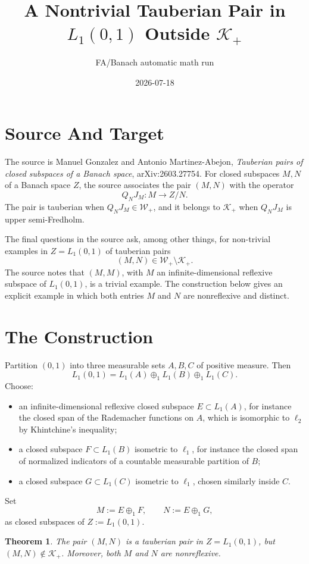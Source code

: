 \documentclass[11pt]{article}
\title{A Nontrivial Tauberian Pair in \(L_1(0,1)\) Outside \(\mathcal K_+\)}
\author{FA/Banach automatic math run}
\date{2026-07-18}
\newtheorem{theorem}{Theorem}
\newcommand{\oplusone}{\oplus_1}
\begin{document}
\maketitle

\section*{Source And Target}

The source is Manuel Gonzalez and Antonio Martinez-Abejon,
\emph{Tauberian pairs of closed subspaces of a Banach space},
arXiv:2603.27754.  For closed subspaces \(M,N\) of a Banach space \(Z\), the
source associates the pair \((M,N)\) with the operator
\[
  Q_NJ_M:M\longrightarrow Z/N.
\]
The pair is tauberian when \(Q_NJ_M\in\mathcal W_+\), and it belongs to
\(\mathcal K_+\) when \(Q_NJ_M\) is upper semi-Fredholm.

The final questions in the source ask, among other things, for non-trivial
examples in \(Z=L_1(0,1)\) of tauberian pairs
\[
  (M,N)\in \mathcal W_+\setminus \mathcal K_+.
\]
The source notes that \((M,M)\), with \(M\) an infinite-dimensional reflexive
subspace of \(L_1(0,1)\), is a trivial example.  The construction below gives
an explicit example in which both entries \(M\) and \(N\) are nonreflexive and
distinct.

\section*{The Construction}

Partition \((0,1)\) into three measurable sets \(A,B,C\) of positive measure.
Then
\[
  L_1(0,1)=L_1(A)\oplusone L_1(B)\oplusone L_1(C).
\]
Choose:
\begin{itemize}
\item an infinite-dimensional reflexive closed subspace
  \(E\subset L_1(A)\), for instance the closed span of the Rademacher
  functions on \(A\), which is isomorphic to \(\ell_2\) by Khintchine's
  inequality;
\item a closed subspace \(F\subset L_1(B)\) isometric to \(\ell_1\), for
  instance the closed span of normalized indicators of a countable measurable
  partition of \(B\);
\item a closed subspace \(G\subset L_1(C)\) isometric to \(\ell_1\), chosen
  similarly inside \(C\).
\end{itemize}
Set
\[
  M:=E\oplusone F,\qquad N:=E\oplusone G,
\]
as closed subspaces of \(Z:=L_1(0,1)\).

\begin{theorem}
The pair \((M,N)\) is a tauberian pair in \(Z=L_1(0,1)\), but
\((M,N)\notin\mathcal K_+\).  Moreover, both \(M\) and \(N\) are nonreflexive.
\end{theorem}
\end{document}
